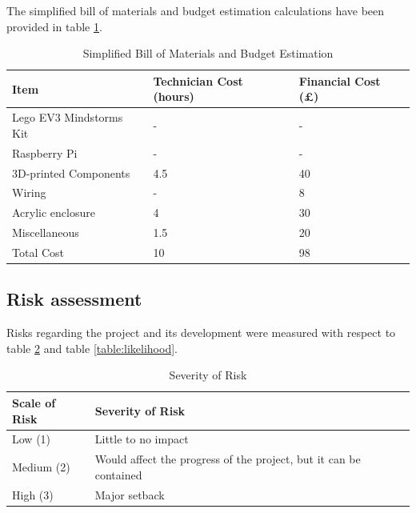 \documentclass{article}
\begin{document}
The simplified bill of materials and budget estimation calculations have been provided in table \ref{table:budget}.

\begin{table}[]
\begin{center}
\begin{small}
\begin{tabular}{|p{3cm}|p{1.5cm}|p{1.5cm}|}
\hline
\rowcolor[HTML]{C0C0C0} 
Item                    & Technician Cost (hours) & Financial Cost (\pounds) \\ \hline
Lego EV3 Mindstorms Kit & -                       & -                  \\ \hline
Raspberry Pi            & -                       & -                  \\ \hline
3D-printed Components   & 4.5                     & 40                 \\ \hline
Wiring                  & -                       & 8                  \\ \hline
Acrylic enclosure       & 4                       & 30                 \\ \hline
Miscellaneous           & 1.5                     & 20                 \\ \hline
Total Cost              & 10                      & 98                 \\ \hline
\end{tabular}
\end{small}
\end{center}
\caption{Simplified Bill of Materials and Budget Estimation}
\label{table:budget}
\end{table}

\subsection{Risk assessment}

Risks regarding the project and its development were measured with respect to table \ref{table:severity} and table \ref{table:likelihood}.

\begin{table}[h]
\begin{center}
\begin{small}
\begin{tabular}{|l|p{3cm}|}
\hline
\rowcolor[HTML]{C0C0C0}Scale of Risk & Severity of Risk                        \\ \hline
Low (1)    & Little to no impact                                               \\ \hline
Medium (2) & Would affect the progress of the project, but it can be contained \\ \hline
High (3)   & Major setback                                                     \\ \hline
\end{tabular}
\end{small}
\end{center}
\caption{Severity of Risk}
\label{table:severity}
\end{table}
\end{document}
